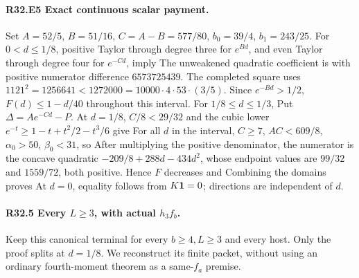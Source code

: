 \paragraph{R32.E5 Exact continuous scalar payment.}
Set \(A=52/5\), \(B=51/16\), \(C=A-B=577/80\), \(b_0=39/4\),
\(b_1=243/25\). For \(0<d\le1/8\), positive Taylor through degree three
for \(e^{Bd}\), and even Taylor through degree four for \(e^{-Cd}\), imply
The unweakened quadratic coefficient is
with positive numerator difference \(6573725439\). The completed square
uses \(1121^2=1256641<1272000=10000\cdot4\cdot53\cdot(3/5)\).
Since \(e^{-Bd}>1/2\), \(F(d)\le1-d/40\) throughout this interval.
For \(1/8\le d\le1/3\),
Put \(\Delta=Ae^{-Cd}-P\). At \(d=1/8\), \(C/8<29/32\) and the cubic
lower \(e^{-t}\ge1-t+t^2/2-t^3/6\) give
For all \(d\) in the interval, \(C\ge7\), \(AC<609/8\),
\(\alpha_0>50\), \(\beta_0<31\), so
After multiplying the positive denominator, the numerator is the concave
quadratic \(-209/8+288d-434d^2\), whose endpoint values are \(99/32\)
and \(1559/72\), both positive. Hence \(F\) decreases and
Combining the domains proves
At \(d=0\), equality follows from \(K\mathbf1=0\); directions are independent of \(d\).

\paragraph{R32.5 Every \(L\ge3\), with actual \(h_3f_b\).}
Keep this canonical terminal for every \(b\ge4,\allowbreak L\ge3\) and every host.
Only the proof splits at \(d=1/8\). We reconstruct its finite packet,
without using an ordinary fourth-moment theorem as a same-\(f_a\) premise.

